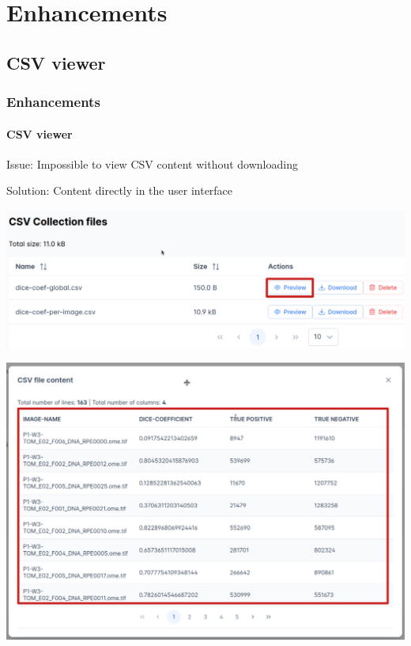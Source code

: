 \def\sectiontitle{Enhancements}

\section{\sectiontitle}

\def\slidetitle{CSV viewer}

\subsection{\slidetitle}
\begin{frame}
  \frametitle{\sectiontitle}
  \framesubtitle{\slidetitle}

  Issue: Impossible to view CSV content without downloading

  Solution: Content directly in the user interface

  \begin{minipage}[h!]{0.10\textwidth}
    \includegraphics[scale=0.16]{./img/csv_actions.png}
  \end{minipage}\hfill
  \begin{minipage}[h!]{0.45\textwidth}
    \includegraphics[scale=0.17]{./img/csv_content.png}
  \end{minipage}
\end{frame}

